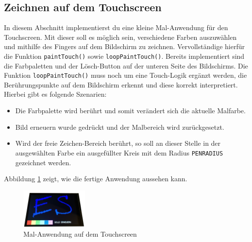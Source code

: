 \subsection{Zeichnen auf dem Touchscreen}
In diesem Abschnitt implementierst du eine kleine Mal-Anwendung für den Touchscreen.
Mit dieser soll es möglich sein, verschiedene Farben auszuwählen und mithilfe des Fingers auf dem Bildschirm zu zeichnen.
Vervollständige hierfür die Funktion \lstinline|paintTouch()| sowie \lstinline|loopPaintTouch()|.
Bereits implementiert sind die Farbpaletten und der Lösch-Button auf der unteren Seite des Bildschirms.
Die Funktion \lstinline|loopPaintTouch()| muss noch um eine Touch-Logik ergänzt werden, die Berührungspunkte auf dem Bildschirm erkennt und diese korrekt interpretiert.
Hierbei gibt es folgende Szenarien:
\begin{itemize}
\item 
Die Farbpalette wird berührt und somit verändert sich die aktuelle Malfarbe.
\item 
Bild erneuern wurde gedrückt und der Malbereich wird zurückgesetzt.
\item 
Wird der freie Zeichen-Bereich berührt, so soll an dieser Stelle in der ausgewählten Farbe ein ausgefüllter Kreis mit dem Radius \lstinline|PENRADIUS| gezeichnet werden.
\end{itemize}
Abbildung \ref{fig:paintTouch} zeigt, wie die fertige Anwendung aussehen kann.
\begin{figure}[!htb]
	\centering
	\includegraphics[width=0.3\textwidth]{./05_c/figures/Paint-Szenario.png}
	\caption{Mal-Anwendung auf dem Touchscreen}
	\label{fig:paintTouch}
\end{figure} 